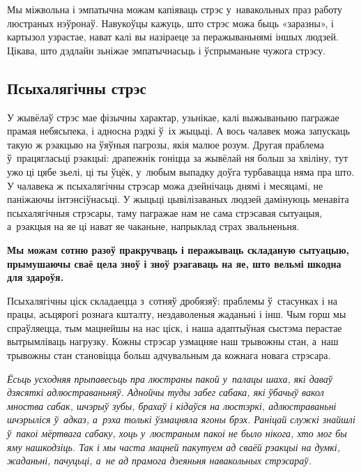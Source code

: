 Мы міжвольна і эмпатычна можам капіяваць стрэс у~навакольных праз работу люстраных нэўронаў. Навукоўцы кажуць, што стрэс можа быць «заразны», і картызол узрастае, нават калі вы назіраеце за перажываньнямі іншых людзей. Цікава, што дэдлайн зьніжае эмпатычнасьць і ўспрыманьне чужога стрэсу.

\subsection*{Псыхалягічны стрэс}

У жывёлаў стрэс мае фізычны характар, узьнікае, калі выжываньню пагражае прамая небясьпека, і адносна рэдкі ў~іх жыцьці. А вось чалавек можа запускаць такую ж рэакцыю на ўяўныя пагрозы, якія малюе розум. Другая праблема ў~працягласьці рэакцыі: драпежнік гоніцца за жывёлай ня больш за хвіліну, тут ужо ці цябе зьелі, ці ты ўцёк, у~любым выпадку доўга турбавацца няма пра што. У чалавека ж псыхалягічны стрэсар можа дзейнічаць днямі і месяцамі, не паніжаючы інтэнсіўнасьці. У жыцьці цывілізаваных людзей дамінуюць менавіта псыхалягічныя стрэсары, таму пагражае нам не сама стрэсавая сытуацыя, а~рэакцыя на яе ці нават яе чаканьне, напрыклад страх звальненьня. 

\textbf{Мы можам сотню разоў пракручваць і перажываць складаную сытуацыю, прымушаючы сваё цела зноў і зноў рэагаваць на яе, што вельмі шкодна для здароўя.}

Псыхалягічны ціск складаецца з~сотняў дробязяў: праблемы ў~стасунках і на працы, асьцярогі рознага кшталту, нездаволеныя жаданьні і інш. Чым горш мы спраўляецца, тым мацнейшы на нас ціск, і наша адаптыўная сыстэма перастае вытрымліваць нагрузку. Кожны стрэсар узмацняе наш трывожны стан, а~наш трывожны стан становіцца больш адчувальным да кожнага новага стрэсара.

\emph{Ёсьць усходняя прыпавесьць пра люстраны пакой у~палацы шаха, які даваў дзясяткі адлюстраваньняў. Аднойчы туды забег сабака, які ўбачыў вакол мноства сабак, шчэрыў зубы, брахаў і кідаўся на люстэркі, адлюстраваньні шчэрыліся ў~адказ, а~рэха толькі ўзмацняла ягоны брэх. Раніцай служкі знайшлі ў~пакоі мёртвага сабаку, хоць у~люстраным пакоі не было нікога, хто мог бы яму нашкодзіць. Так і мы часта мацней пакутуем ад сваёй рэакцыі на думкі, жаданьні, пачуцьці, а~не ад прамога дзеяньня навакольных стрэсараў.}


